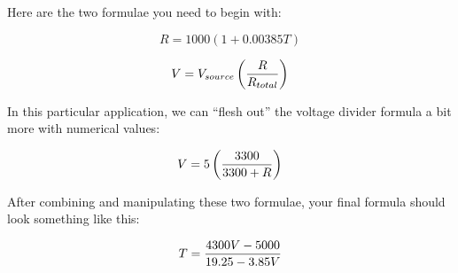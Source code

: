 





Here are the two formulae you need to begin with:
 
$$R = 1000 (1 + 0.00385 T)$$

$$V = V_{source} \left( {R \over R_{total}} \right)$$

In this particular application, we can ``flesh out'' the voltage divider formula a bit more with numerical values:

$$V = 5 \left( {3300 \over {3300 + R}} \right)$$

\vskip 10pt

After combining and manipulating these two formulae, your final formula should look something like this:

$$T = {4300 V  - 5000 \over 19.25 - 3.85 V}$$











